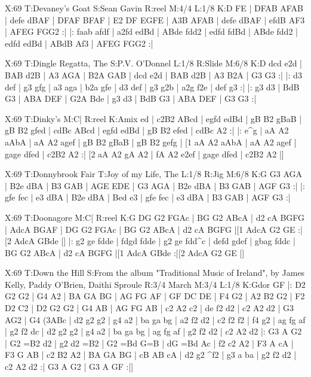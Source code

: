 \documentclass[letterpaper]{article}
\begin{document}
\begin{abc}[name]
X:69
T:Devaney's Goat
S:Sean Gavin
R:reel
M:4/4
L:1/8
K:D
FE | DFAB AFAB | defe dBAF | DFAF BFAF | E2 DF EGFE |
A3B AFAB | defe dBAF | efdB AF3 | AFEG FGG2 :|
|: faab afdf | a2fd edBd | ABde fdd2 | edfd fdBd |
ABde fdd2 | edfd edBd | ABdB Af3 | AFEG FGG2 :|
\end{abc}

\begin{abc}[name]
X:69
T:Dingle Regatta, The
S:P.V. O'Donnel
L:1/8
R:Slide
M:6/8
K:D
dcd e2d | BAB d2B | A3 AGA | B2A GAB |
dcd e2d | BAB d2B | A3 B2A | G3 G3 :|
|: d3 def | g3 gfg | a3 aga | b2a gfe |
d3 def | g3 g2b | a2g f2e | def g3 :|
|: g3 d3 | BdB G3 | ABA DEF | G2A Bde |
g3 d3 | BdB G3 | ABA DEF | G3 G3 :|
\end{abc}

\begin{abc}[name]
X:69
T:Dinky's
M:C|
R:reel
K:Amix
ed | c2B2 ABcd | egfd edBd | gB B2 gBaB | gB B2 gfed |
cdBc ABcd | egfd edBd | gB B2 efed | cdBc A2 :|
|: e^g | aA A2 aAbA | aA A2 agef | gB B2 gBaB | gB B2 gefg |
[1 aA A2 aAbA | aA A2 agef | gage dfed | c2B2 A2 :|
[2 aA A2 gA A2 | fA A2 e2ef | gage dfed | c2B2 A2 |]
\end{abc}

\begin{abc}[name]
X:69
T:Donnybrook Fair
T:Joy of my Life, The
L:1/8
R:Jig
M:6/8
K:G
G3 AGA | B2e dBA | B3 GAB | AGE EDE |
G3 AGA | B2e dBA | B3 GAB | AGF G3 :|
|: gfe fec | e3 dBA | B2e dBA | Bed e3 |
gfe fec | e3 dBA | B3 GAB | AGF G3 :|
\end{abc}

\begin{abc}[name]
X:69
T:Doonagore
M:C|
R:reel
K:G
DG G2 FGAc | BG G2 ABcA | d2 cA BGFG | AdcA BGAF |
DG G2 FGAc | BG G2 ABcA | d2 cA BGFG |[1 AdcA G2 GE :|[2 AdcA GBde |]
|: g2 ge fdde | fdgd fdde | g2 ge fdd^c | defd gdef |
gbag fddc | BG G2 ABcA | d2 cA BGFG |[1 AdcA GBde :|[2 AdcA G2 GE |]
\end{abc}

\begin{abc}[name]
X:69
T:Down the Hill
S:From the album "Traditional Music of Ireland", by James Kelly, Paddy O'Brien, Daithi Sproule
R:3/4 March
M:3/4
L:1/8
K:Gdor
GF |: D2 G2 G2 | G4 A2 | BA GA BG | AG FG AF |
GF DC DE | F4 G2 | A2 B2 G2 | F2 D2 C2 |
D2 G2 G2 | G4 AB | AG FG AB | c2 A2 c2 |
de f2 d2 | c2 A2 d2 | G3 AG2 | G4 (3ABc |
d2 g2 g2 | g4 a2 | ba ga bg | a2 f2 d2 |
c2 f2 f2 | f4 g2 | ag fg af | g2 f2 dc |
d2 g2 g2 | g4 a2 | ba ga bg | ag fg af |
g2 f2 d2 | c2 A2 d2 |: G3 A G2 | G2 =B2 d2 |
g2 d2 =B2 | G2 =Bd G=B | dG =Bd Ac | f2 c2 A2 |
F3 A cA | F3 G AB | c2 B2 A2 | BA GA BG |
cB AB cA | d2 g2 ^f2 | g3 a ba | g2 f2 d2 |
c2 A2 d2 :| G3 A G2 | G3 A GF :|]
\end{abc}
\end{document}
